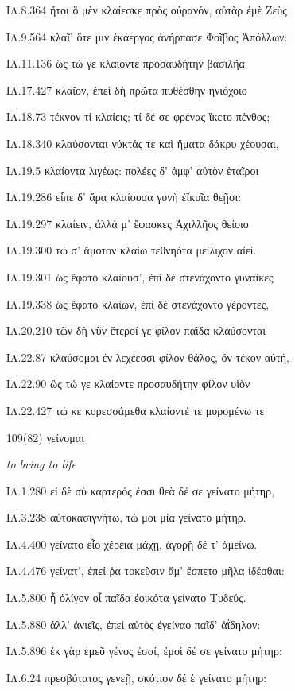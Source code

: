 \begin{enumerate}
{ΙΛ.8.364 ἤτοι ὃ μὲν κλαίεσκε πρὸς οὐρανόν, αὐτὰρ ἐμὲ Ζεὺς

ΙΛ.9.564 κλαῖ' ὅτε μιν ἑκάεργος ἀνήρπασε Φοῖβος Ἀπόλλων:

ΙΛ.11.136 ὣς τώ γε κλαίοντε προσαυδήτην βασιλῆα

ΙΛ.17.427 κλαῖον, ἐπεὶ δὴ πρῶτα πυθέσθην ἡνιόχοιο

ΙΛ.18.73 τέκνον τί κλαίεις; τί δέ σε φρένας ἵκετο πένθος;

ΙΛ.18.340 κλαύσονται νύκτάς τε καὶ ἤματα δάκρυ χέουσαι,

ΙΛ.19.5 κλαίοντα λιγέως: πολέες δ' ἀμφ' αὐτὸν ἑταῖροι

ΙΛ.19.286 εἶπε δ' ἄρα κλαίουσα γυνὴ ἐϊκυῖα θεῇσι:

ΙΛ.19.297 κλαίειν, ἀλλά μ' ἔφασκες Ἀχιλλῆος θείοιο

ΙΛ.19.300 τώ σ' ἄμοτον κλαίω τεθνηότα μείλιχον αἰεί.

ΙΛ.19.301 ὣς ἔφατο κλαίουσ', ἐπὶ δὲ στενάχοντο γυναῖκες

ΙΛ.19.338 ὣς ἔφατο κλαίων, ἐπὶ δὲ στενάχοντο γέροντες,

ΙΛ.20.210 τῶν δὴ νῦν ἕτεροί γε φίλον παῖδα κλαύσονται

ΙΛ.22.87 κλαύσομαι ἐν λεχέεσσι φίλον θάλος, ὃν τέκον αὐτή,

ΙΛ.22.90 ὣς τώ γε κλαίοντε προσαυδήτην φίλον υἱὸν

ΙΛ.22.427 τώ κε κορεσσάμεθα κλαίοντέ τε μυρομένω τε

}

\clearpage
\item[\large 109(82)]{\large \g γείνομαι}

\hspace{0.2cm} \textit{ to bring to life}

{\g
ΙΛ.1.280 εἰ δὲ σὺ καρτερός ἐσσι θεὰ δέ σε γείνατο μήτηρ,

ΙΛ.3.238 αὐτοκασιγνήτω, τώ μοι μία γείνατο μήτηρ.

ΙΛ.4.400 γείνατο εἷο χέρεια μάχῃ, ἀγορῇ δέ τ' ἀμείνω.

ΙΛ.4.476 γείνατ', ἐπεί ῥα τοκεῦσιν ἅμ' ἕσπετο μῆλα ἰδέσθαι:

ΙΛ.5.800 ἦ ὀλίγον οἷ παῖδα ἐοικότα γείνατο Τυδεύς.

ΙΛ.5.880 ἀλλ' ἀνιεῖς, ἐπεὶ αὐτὸς ἐγείναο παῖδ' ἀΐδηλον:

ΙΛ.5.896 ἐκ γὰρ ἐμεῦ γένος ἐσσί, ἐμοὶ δέ σε γείνατο μήτηρ:

ΙΛ.6.24 πρεσβύτατος γενεῇ, σκότιον δέ ἑ γείνατο μήτηρ:

}
\end{enumerate}

